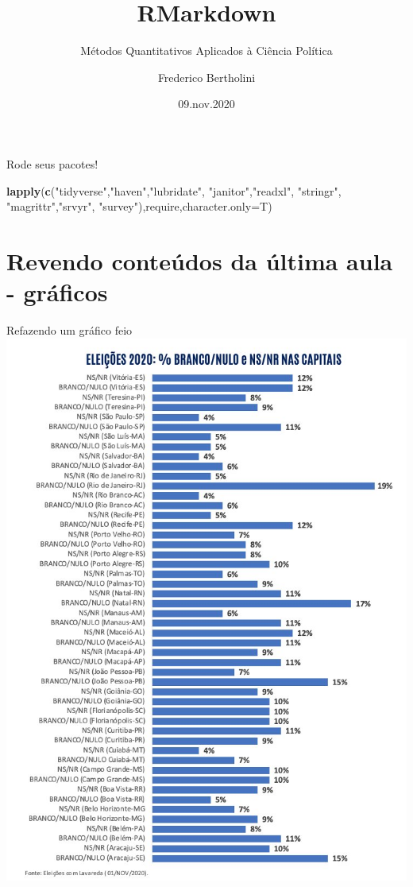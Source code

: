 \documentclass[
  9pt,
  ignorenonframetext,
]{beamer}
\title{RMarkdown}
\subtitle{Métodos Quantitativos Aplicados à Ciência Política}
\author{Frederico Bertholini}
\date{09.nov.2020}
\newenvironment{Shaded}{\begin{snugshade}}{\end{snugshade}}
\newcommand{\DataTypeTok}[1]{\textcolor[rgb]{0.13,0.29,0.53}{#1}}
\newcommand{\KeywordTok}[1]{\textcolor[rgb]{0.13,0.29,0.53}{\textbf{#1}}}
\newcommand{\NormalTok}[1]{#1}
\newcommand{\StringTok}[1]{\textcolor[rgb]{0.31,0.60,0.02}{#1}}
\begin{document}
\frame{\titlepage}

\begin{frame}[allowframebreaks]
  \tableofcontents[hideallsubsections]
\end{frame}
\begin{frame}[fragile]{Rode seus pacotes!}
\protect\hypertarget{rode-seus-pacotes}{}
\begin{Shaded}
\begin{Highlighting}[]
\KeywordTok{lapply}\NormalTok{(}\KeywordTok{c}\NormalTok{(}\StringTok{"tidyverse"}\NormalTok{,}\StringTok{"haven"}\NormalTok{,}\StringTok{"lubridate"}\NormalTok{,}
         \StringTok{"janitor"}\NormalTok{,}\StringTok{"readxl"}\NormalTok{,}
          \StringTok{"stringr"}\NormalTok{, }\StringTok{"magrittr"}\NormalTok{,}\StringTok{"srvyr"}\NormalTok{,}
         \StringTok{"survey"}\NormalTok{),require,}\DataTypeTok{character.only=}\NormalTok{T)}
\end{Highlighting}
\end{Shaded}
\end{frame}

\hypertarget{revendo-conteuxfados-da-uxfaltima-aula---gruxe1ficos}{%
\section{Revendo conteúdos da última aula -
gráficos}\label{revendo-conteuxfados-da-uxfaltima-aula---gruxe1ficos}}

\begin{frame}{Refazendo um gráfico feio}
\protect\hypertarget{refazendo-um-gruxe1fico-feio}{}
\includegraphics{imgs/grafico_feio.jpeg}
\end{frame}
\end{document}
